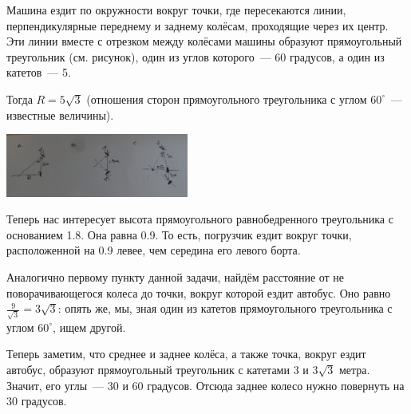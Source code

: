 \begin{itemize}

\itA Машина ездит по окружности вокруг точки, где пересекаются линии, перпендикулярные переднему и заднему колёсам, проходящие через их центр. Эти линии вместе с отрезком между колёсами машины образуют прямоугольный треугольник (см. рисунок), один из углов которого~— 60 градусов, а один из катетов~— \SI{5}{}.

Тогда $R = 5 \sqrt{3}$ (отношения сторон прямоугольного треугольника с углом $60^\circ$~— известные величины).

\begin{center}
	\includegraphics[natwidth=4016,natheight=1392,width=6cm]{figures/2018-cars-no-buks}
\end{center}

\itB Теперь нас интересует высота прямоугольного равнобедренного треугольника с основанием \SI{1.8}{}. Она равна \SI{0.9}{}. То есть, погрузчик ездит вокруг точки, расположенной на \SI{0.9}{} левее, чем середина его левого борта.

\itC Аналогично первому пункту данной задачи, найдём расстояние от не поворачивающегося колеса до точки, вокруг которой ездит автобус. Оно равно $\tfrac{9}{\sqrt{3}} = 3\sqrt{3}$: опять же, мы, зная один из катетов прямоугольного треугольника с углом $60^\circ$, ищем другой.

Теперь заметим, что среднее и заднее колёса, а также точка, вокруг ездит автобус, образуют прямоугольный треугольник с катетами $3$ и $3\sqrt{3}$ метра. Значит, его углы~— 30 и 60 градусов. Отсюда заднее колесо нужно повернуть на 30 градусов.
\end{itemize}